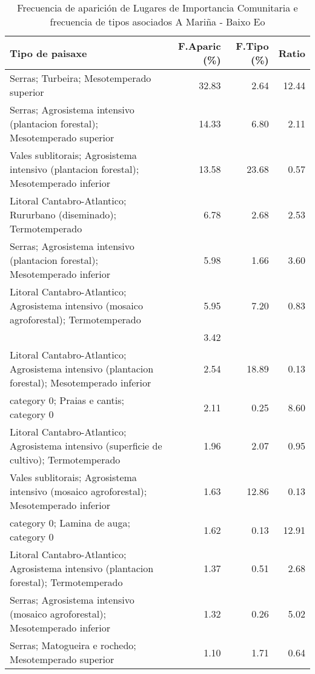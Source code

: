 \begin{table}[p]
\centering
\caption{Frecuencia de aparición de Lugares de Importancia Comunitaria e frecuencia de tipos asociados A Mariña - Baixo Eo} 
\label{vnatura2}
\begin{tabular}{lrrr}
  \hline
Tipo de paisaxe & F.Aparic (\%) & F.Tipo (\%) & Ratio \\ 
  \hline
Serras; Turbeira; Mesotemperado superior & 32.83 & 2.64 & 12.44 \\ 
  Serras; Agrosistema intensivo (plantacion forestal); Mesotemperado superior & 14.33 & 6.80 & 2.11 \\ 
  Vales sublitorais; Agrosistema intensivo (plantacion forestal); Mesotemperado inferior & 13.58 & 23.68 & 0.57 \\ 
  Litoral Cantabro-Atlantico; Rururbano (diseminado); Termotemperado & 6.78 & 2.68 & 2.53 \\ 
  Serras; Agrosistema intensivo (plantacion forestal); Mesotemperado inferior & 5.98 & 1.66 & 3.60 \\ 
  Litoral Cantabro-Atlantico; Agrosistema intensivo (mosaico agroforestal); Termotemperado & 5.95 & 7.20 & 0.83 \\ 
   & 3.42 &  &  \\ 
  Litoral Cantabro-Atlantico; Agrosistema intensivo (plantacion forestal); Mesotemperado inferior & 2.54 & 18.89 & 0.13 \\ 
  category 0; Praias e cantis; category 0 & 2.11 & 0.25 & 8.60 \\ 
  Litoral Cantabro-Atlantico; Agrosistema intensivo (superficie de cultivo); Termotemperado & 1.96 & 2.07 & 0.95 \\ 
  Vales sublitorais; Agrosistema intensivo (mosaico agroforestal); Mesotemperado inferior & 1.63 & 12.86 & 0.13 \\ 
  category 0; Lamina de auga; category 0 & 1.62 & 0.13 & 12.91 \\ 
  Litoral Cantabro-Atlantico; Agrosistema intensivo (plantacion forestal); Termotemperado & 1.37 & 0.51 & 2.68 \\ 
  Serras; Agrosistema intensivo (mosaico agroforestal); Mesotemperado inferior & 1.32 & 0.26 & 5.02 \\ 
  Serras; Matogueira e rochedo; Mesotemperado superior & 1.10 & 1.71 & 0.64 \\ 
   \hline
\end{tabular}
\end{table}
